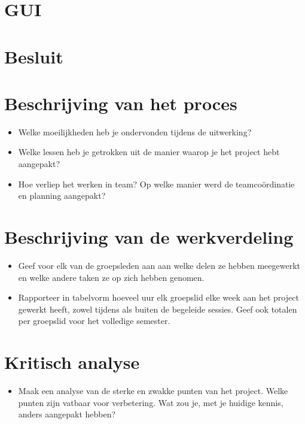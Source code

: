\documentclass[tt]{penoverslag}
\begin{document}
\section{GUI}





\section{Besluit}







\newpage\makeappendix

\section{Beschrijving van het proces}
\begin{itemize}
\item Welke moeilijkheden heb je ondervonden tijdens de uitwerking?
\item Welke lessen heb je getrokken uit de manier waarop je het project hebt aangepakt?
\item Hoe verliep het werken in team? Op welke manier werd de teamco\"ordinatie en planning aangepakt?
\end{itemize}


\section{Beschrijving van de werkverdeling}
\begin{itemize}
\item Geef voor elk van de groepsleden aan aan welke delen ze hebben meegewerkt en welke andere taken ze op zich hebben genomen.
\item Rapporteer in tabelvorm hoeveel uur elk groepslid elke week aan het project gewerkt heeft, zowel tijdens als buiten de begeleide sessies. Geef ook totalen per groepslid voor het volledige semester.
\end{itemize}


\section{Kritisch analyse}
\begin{itemize}
\item Maak een analyse van de sterke en zwakke punten van het project. Welke punten zijn vatbaar voor verbetering. Wat zou je, met je huidige kennis, anders aangepakt hebben?
\end{itemize}
\end{document}
